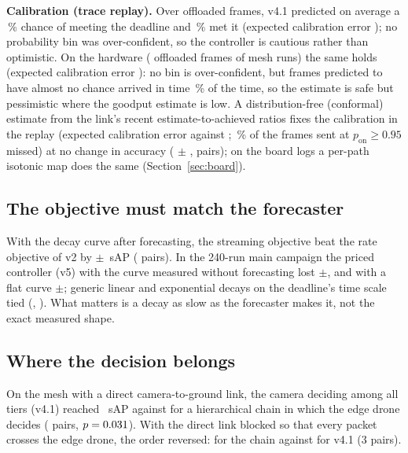 \documentclass[conference]{IEEEtran}
\begin{document}
\textbf{Calibration (trace replay).} Over \CalFrames{} offloaded frames, v4.1 predicted on average a \CalPred\,\%
chance of meeting the deadline and \CalObs\,\% met it (expected calibration error \CalEce{}); no probability bin was
over-confident, so the controller is cautious rather than optimistic. On the hardware (\BdCalFrames{} offloaded frames
of \BdCalRuns{} mesh runs) the same holds (expected calibration error \BdCalEce): no bin is over-confident, but frames
predicted to have almost no chance arrived in time \BdCalLowObs\,\% of the time, so the estimate is safe but pessimistic
where the goodput estimate is low. A distribution-free (conformal) estimate from the link's recent estimate-to-achieved ratios fixes the calibration in the
replay (expected calibration error \CfEceConf{} against \CfEceGauss; \CfMiss\,\% of the frames sent at $p_{\mathrm{on}} \ge 0.95$
missed) at no change in accuracy (\CfSap{} $\pm$ \CfSapCi, \CfPairs{} pairs); on the board logs a per-path isotonic map does the
same (Section~\ref{sec:board}).

\subsection{The objective must match the forecaster}\label{sec:decay}
With the decay curve after forecasting, the streaming objective beat the rate objective of v2 by
\FcGain{}$\pm$\FcGainCi{}~sAP (\FcPairs{} pairs). In the 240-run main campaign the priced controller (v5) with the curve
measured without forecasting lost \MainNoFcLoss{}$\pm$\MainNoFcCi{}, and with a flat curve \MainFlatLoss{}$\pm$\MainFlatCi{}; generic
linear and exponential decays on the deadline's time scale tied (\MainLin{}, \MainExp{}). What matters is a decay as
slow as the forecaster makes it, not the exact measured shape.

\subsection{Where the decision belongs}\label{sec:topology}
On the mesh with a direct camera-to-ground link, the camera deciding among all tiers (v4.1) reached \TopoDirectV{}~sAP
against \TopoDirectH{} for a hierarchical chain in which the edge drone decides (\TopoDirectPairs{} pairs,
$p=0.031{}$). With the direct link blocked so that every packet crosses the edge drone, the order reversed:
\TopoMultiH{} for the chain against \TopoMultiV{} for v4.1 (3 pairs).
\end{document}
